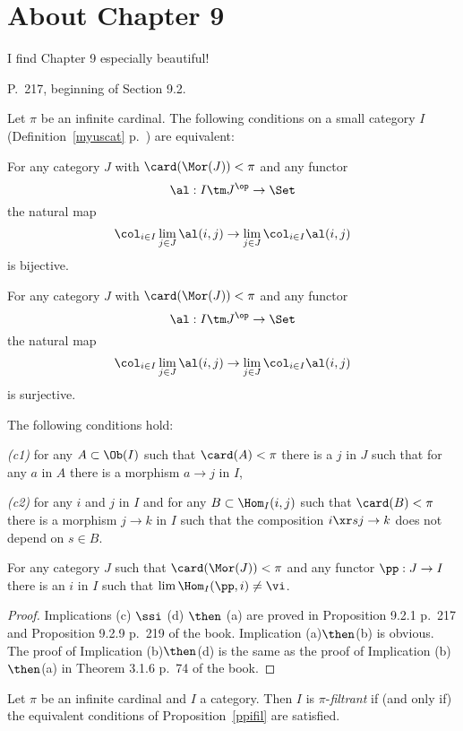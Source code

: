 \documentclass[12pt]{article}
\theoremstyle{remark}
\theoremstyle{definition}
\begin{document}

\section{About Chapter 9}

I find Chapter 9 especially beautiful!


\begin{s}
P.~217, beginning of Section 9.2. 

\begin{prop}
Let $\pi$ be an infinite cardinal. The following conditions on a small category $I$ (Definition~\ref{myuscat} p.~) are equivalent:

 For any category $J$ with $\card(\Mor(J))<\pi$ and any functor 
$$
\al:I\tm J^{\op}\to\Set
$$ 
the natural map 
$$
\col_{i\in I}\lim_{j\in J}\al(i,j)\to\lim_{j\in J}\col_{i\in I}\al(i,j)
$$ 
is bijective.

 For any category $J$ with $\card(\Mor(J))<\pi$ and any functor 
$$
\al:I\tm J^{\op}\to\Set
$$ 
the natural map 
$$
\col_{i\in I}\lim_{j\in J}\al(i,j)\to\lim_{j\in J}\col_{i\in I}\al(i,j)
$$ 
is surjective.

 The following conditions hold:

{\em(c1)} for any $A\subset\Ob(I)$ such that $\card(A)<\pi$ there is a $j$ in $J$ such that for any $a$ in $A$ there is a morphism $a\to j$ in $I$,

{\em(c2)} for any $i$ and $j$ in $I$ and for any $B\subset\Hom_I(i,j)$ such that $\card(B)<\pi$ there is a morphism $j\to k$ in $I$ such that the composition $i\xr sj\to k$ does not depend on $s\in B$.

 For any category $J$ such that $\card(\Mor(J))<\pi$ and any functor $\pp:J\to I$ there is an $i$ in $I$ such that $\lim\Hom_I(\pp,i)\neq\vi$. 
\end{prop}

\begin{proof}
Implications (c) $\ssi$ (d) $\then$ (a) are proved in Proposition 9.2.1 p.~217 and Proposition 9.2.9 p.~219 of the book. Implication (a)$\then$(b) is obvious. The proof of Implication (b)$\then$(d) is the same as the proof of Implication (b)$\then$(a) in Theorem 3.1.6 p.~74 of the book.
\end{proof}

\begin{df} 
Let $\pi$ be an infinite cardinal and $I$ a category. Then $I$ is $\pi$-{\em filtrant} if (and only if) the equivalent conditions of Proposition~\ref{ppifil} are satisfied.
\end{df}
\end{s}
\end{document}
